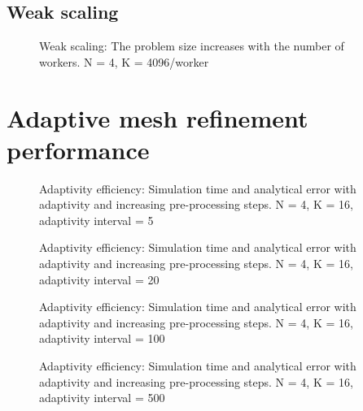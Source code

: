 
\subsection{Weak scaling} \label{section:results:scaling_tests:weak}


\begin{figure}[H]
	\centering
	
	\caption{Weak scaling: The problem size increases with the number of workers. N = 4, K = 4096/worker}
	\label{fig:weak_scaling}
\end{figure}

\section{Adaptive mesh refinement performance} \label{section:results:adaptivity_performance}

\begin{figure}[H]
	\centering
	
	\caption{Adaptivity efficiency: Simulation time and analytical error with adaptivity and increasing pre-processing steps. N = 4, K = 16, adaptivity interval = 5}
	\label{fig:adaptivity_efficiency_C5}
\end{figure}

\begin{figure}[H]
	\centering
	
	\caption{Adaptivity efficiency: Simulation time and analytical error with adaptivity and increasing pre-processing steps. N = 4, K = 16, adaptivity interval = 20}
	\label{fig:adaptivity_efficiency_C20}
\end{figure}

\begin{figure}[H]
	\centering
	
	\caption{Adaptivity efficiency: Simulation time and analytical error with adaptivity and increasing pre-processing steps. N = 4, K = 16, adaptivity interval = 100}
	\label{fig:adaptivity_efficiency_C100}
\end{figure}

\begin{figure}[H]
	\centering
	
	\caption{Adaptivity efficiency: Simulation time and analytical error with adaptivity and increasing pre-processing steps. N = 4, K = 16, adaptivity interval = 500}
	\label{fig:adaptivity_efficiency_C500}
\end{figure}

